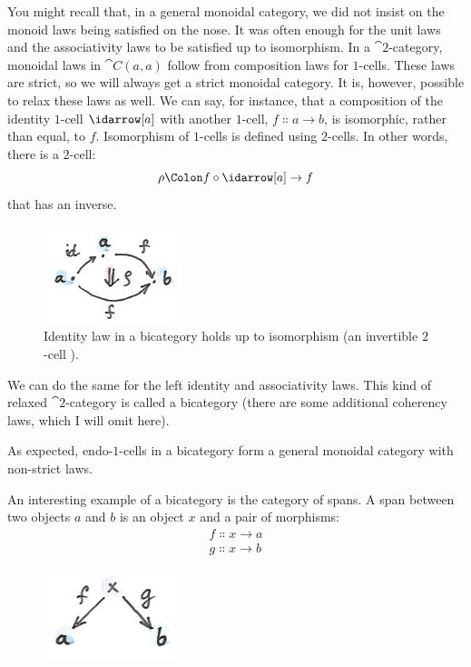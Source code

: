 You might recall that, in a general monoidal category, we did not insist
on the monoid laws being satisfied on the nose. It was often enough for
the unit laws and the associativity laws to be satisfied up to
isomorphism. In a $\cat{2}$-category, monoidal laws in $\cat{C}(a, a)$ follow
from composition laws for $1$-cells. These laws are strict, so we will
always get a strict monoidal category. It is, however, possible to relax
these laws as well. We can say, for instance, that a composition of the
identity $1$-cell $\idarrow[a]$ with another $1$-cell,
$f \Colon a \to b$, is isomorphic, rather than equal,
to $f$. Isomorphism of $1$-cells is defined using $2$-cells. In other
words, there is a $2$-cell:
\[\rho \Colon f \circ \idarrow[a] \to f\]
that has an inverse.

\begin{figure}[H]
\centering
\includegraphics[width=40mm]{images/bicat.png}
\caption{Identity law in a bicategory holds up to isomorphism (an invertible
$2$-cell \rho).}
\end{figure}

\noindent
We can do the same for the left identity and associativity laws. This
kind of relaxed $\cat{2}$-category is called a bicategory (there are some
additional coherency laws, which I will omit here).

As expected, endo-$1$-cells in a bicategory form a general monoidal
category with non-strict laws.

An interesting example of a bicategory is the category of spans. A span
between two objects $a$ and $b$ is an object $x$
and a pair of morphisms:
\begin{gather*}
f \Colon x \to a \\
g \Colon x \to b
\end{gather*}

\begin{figure}[H]
\centering
\includegraphics[width=40mm]{images/span.png}
\end{figure}


